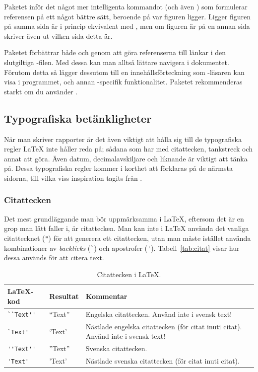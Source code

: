 \documentclass[../../latex.tex]{subfiles}
\begin{document}
Paketet  inför det något mer intelligenta kommandot
 (och även ) som formulerar referensen på ett
något bättre sätt, beroende på var figuren ligger. Ligger figuren på samma
sida är  i princip ekvivalent med , men om figuren är
på en annan sida skriver  även ut vilken sida detta är.

Paketet  förbättrar både  och  genom att
göra referenserna till länkar i den slutgiltiga \PDF-filen. Med dessa kan
man alltså lättare navigera i dokumentet. Förutom detta så lägger
 dessutom till en innehållsförteckning som \PDF-läsaren
kan visa i programmet, och annan \PDF-specifik funktionalitet. Paketet
rekommenderas starkt om du använder \pdfLaTeX.

\subsection{Typografiska betänkligheter}
När man skriver rapporter är det även viktigt att hålla sig till de
typografiska regler \LaTeX{} inte håller reda på; sådana som har med
citattecken, tankstreck och annat att göra. Även datum, decimalavskiljare
och liknande är viktigt att tänka på. Dessa typografiska regler kommer i
korthet att förklaras på de närmsta sidorna, till vilka viss inspiration 
tagits från .

\subsubsection{Citattecken}
Det mest grundläggande man bör uppmärksamma i \LaTeX{}, eftersom det är en
grop man lätt faller i, är citattecken. Man kan inte i \LaTeX{} använda
det vanliga citattecknet (\verb|"|) för att generera ett citattecken, utan
man måste istället använda kombinationer av \emph{backticks} (\verb|`|)
och apostrofer (\verb|'|). Tabell~\vref{tab:citat} visar hur dessa används
för att citera text.

\begin{table}[tbp]
	\centering 
	\caption{Citattecken i \LaTeX.}
	\label{tab:citat}
	\begin{tabular}{l l p{}}
		\toprule 
		\LaTeX-kod & Resultat & Kommentar \\ 
		\midrule 
		\verb|``Text''| & “Text” & Engelska citattecken. Använd inte i
		svensk text! \\
		\verb|`Text'| & ‘Text’ & Nästlade engelska citattecken (för citat
		inuti citat). Använd inte i svensk text! \\ 
		\verb|''Text''| & ”Text” & Svenska citattecken. \\
		\verb|'Text'| & ’Text’ & Nästlade svenska citattecken (för citat
		inuti citat). \\
		\bottomrule 
	\end{tabular}
\end{table}
\end{document}
